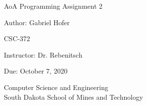 \documentclass[12pt]{article}
\begin{document}
\begin{titlepage}
   \begin{center}
       \vspace*{1cm}
       \Large
       AoA Programming Assignment 2
       \normalsize

       \vspace{0.5cm}

       Author: Gabriel Hofer

       \vspace{0.5cm}

       CSC-372

       \vspace{0.5cm}

       Instructor: Dr. Rebenitsch
       \vspace{0.5cm}

       Due: October 7, 2020

       \vfill

       Computer Science and Engineering\\
       South Dakota School of Mines and Technology\\
   \end{center}
\end{titlepage}
\newpage
\end{document}
